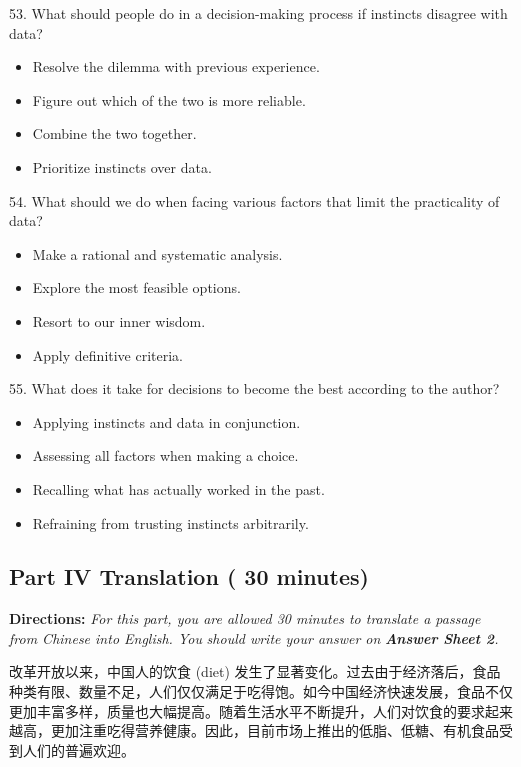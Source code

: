 \documentclass[UTF8,11pt]{ctexart}
\begin{document}
53. What should people do in a decision-making process if instincts disagree with data?


\begin{itemize}[leftmargin=2em,itemsep=.2em,topsep=.4em]\item[A.] Resolve the dilemma with previous experience.
\item[B.] Figure out which of the two is more reliable.
\item[C.] Combine the two together.
\item[D.] Prioritize instincts over data.
\end{itemize}

54. What should we do when facing various factors that limit the practicality of data?


\begin{itemize}[leftmargin=2em,itemsep=.2em,topsep=.4em]\item[A.] Make a rational and systematic analysis.
\item[B.] Explore the most feasible options.
\item[C.] Resort to our inner wisdom.
\item[D.] Apply definitive criteria.
\end{itemize}

55. What does it take for decisions to become the best according to the author?


\begin{itemize}[leftmargin=2em,itemsep=.2em,topsep=.4em]\item[A.] Applying instincts and data in conjunction.
\item[B.] Assessing all factors when making a choice.
\item[C.] Recalling what has actually worked in the past.
\item[D.] Refraining from trusting instincts arbitrarily.
\end{itemize}

\subsection*{\textbf{Part IV Translation} \textbf{( 30 minutes)}}


\textbf{Directions: }\textit{For this part, you are allowed 30 minutes to translate a passage from Chinese into English. You} \textit{should write your answer on }\textbf{\textit{Answer Sheet 2}}\textit{.}


改革开放以来，中国人的饮食 (diet) 发生了显著变化。过去由于经济落后，食品种类有限、数量不足，人们仅仅满足于吃得饱。如今中国经济快速发展，食品不仅更加丰富多样，质量也大幅提高。随着生活水平不断提升，人们对饮食的要求起来越高，更加注重吃得营养健康。因此，目前市场上推出的低脂、低糖、有机食品受到人们的普遍欢迎。
\end{document}
